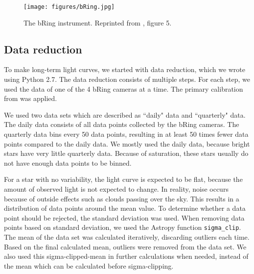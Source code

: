 \documentclass[onecolumn]{aa} %
\begin{document}
\begin{figure}
    \centering
    \texttt{[image: figures/bRing.jpg]}
    \caption{The bRing instrument. Reprinted from \cite{bring}, figure 5.}
    \label{bRing}
\end{figure}


\subsection{Data reduction}
To make long-term light curves, we started with data reduction, which we wrote using Python 2.7.
The data reduction consists of multiple steps. For each step, we used the data of one of the 4 bRing cameras at a time. The primary calibration from \cite{Talens_2018} was applied.

We used two data sets which are described as ``daily" data and ``quarterly" data. The daily data consists of all data points collected by the bRing cameras. The quarterly data bins every 50 data points, resulting in at least 50 times fewer data points compared to the daily data. We mostly used the daily data, because bright stars have very little quarterly data. Because of saturation, these stars usually do not have enough data points to be binned. 

For a star with no variability, the light curve is expected to be flat, because the amount of observed light is not expected to change. In reality, noise occurs because of outside effects such as clouds passing over the sky. This results in a distribution of data points around the mean value. To determine whether a data point should be rejected, the standard deviation was used. When removing data points based on standard deviation, we used the Astropy function \texttt{sigma\_clip}. The mean of the data set was calculated iteratively, discarding outliers each time. Based on the final calculated mean, outliers were removed from the data set. We also used this sigma-clipped-mean in further calculations when needed, instead of the mean which can be calculated before sigma-clipping.
\end{document}
